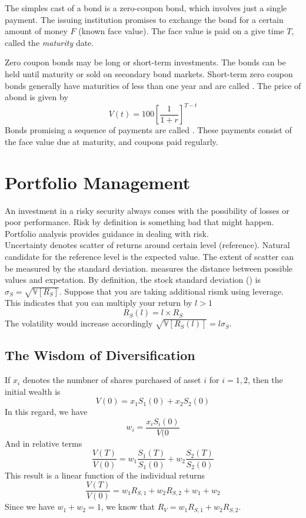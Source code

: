 \documentclass{article}
\begin{document}
\begin{definition}
  The simples cast of a bond is a zero-coupon bond, which involves just a single payment. The issuing institution promises to exchange the bond for a certain amount of money $F$ (known face value). The face value is paid on a give time $T$, called the \emph{maturity} date. 
\end{definition}
Zero coupon bonds may be long or short-term investments. The bonds can be held until maturity or sold on secondary bond markets. Short-term zero coupon bonds generally have maturities of less than one year and are called . The price of abond is given by $$V(t) = 100[\frac{1}{1+r}]^{T-t}$$ Bonds promising a sequence of payments are called . These payments consist of the face value due at maturity, and coupons paid regularly. 

\section{Portfolio Management}

An investment in a risky security always comes with the possibility of losses or poor performance. Risk by definition is something bad that might happen. Portfolio analysis provides guidance in dealing with risk. \\ 

Uncertainty denotes scatter of returns around certain level (reference). Natural candidate for the reference level is the expected value. The extent of scatter can be measured by the standard deviation.  measures the distance between possible values and expetation. By definition, the stock standard deviation () is $\sigma_S = \sqrt{\mathbb{V}[R_S]}$. Suppose that you are taking additional rismk using leverage. This indicates that you can multiply your return by $l > 1$ $$R_S (l) = l \times R_S$$ The volatility would increase accordingly $\sqrt{\mathbb{V}[R_S (l)]} = l \sigma_S$. 

\subsection{The Wisdom of Diversification}

If $x_i$ denotes the numbner of shares purchased of asset $i$ for $i = 1,2$, then the initial wealth is $$V(0) = x_1 S_1 (0) + x_2 S_2 (0)$$ In this regard, we have $$w_i = \frac{x_i S_i (0)}{V(0}$$ And in relative terms $$\frac{V(T)}{V(0)} = w_1 \frac{S_1 (T)}{S_1 (0)} + w_2 \frac{S_2 (T)}{S_2 (0)}$$ This result is a linear function of the individual returns $$\frac{V(T)}{V(0)} = w_1  R_{S,1} + w_2 R_{S,2} + w_1 + w_2$$ Since we have $w_1 + w_2 = 1$, we know that $R_V = w_1 R_{S, 1} + w_2 R_{S,2}$. \\ 
\end{document}
